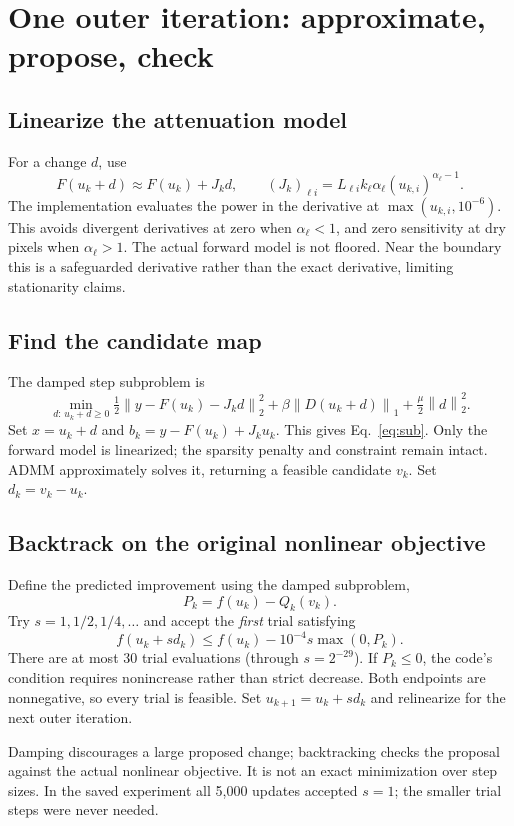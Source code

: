 \documentclass[11pt,a4paper]{article}
\newcommand{\norm}[1]{\left\lVert#1\right\rVert}
\begin{document}
\section{One outer iteration: approximate, propose, check}
\subsection{Linearize the attenuation model}
For a change $d$, use
\[
 F(u_k+d)\approx F(u_k)+J_kd,\qquad
 (J_k)_{\ell i}=L_{\ell i}k_\ell\alpha_\ell(u_{k,i})^{\alpha_\ell-1}.
\]
The implementation evaluates the power in the derivative at $\max(u_{k,i},10^{-6})$. This avoids divergent derivatives at zero when $\alpha_\ell<1$, and zero sensitivity at dry pixels when $\alpha_\ell>1$. The actual forward model is not floored. Near the boundary this is a safeguarded derivative rather than the exact derivative, limiting stationarity claims.
\subsection{Find the candidate map}
The damped step subproblem is
\[
 \min_{d:\,u_k+d\ge0}
 \tfrac12\norm{y-F(u_k)-J_kd}_2^2
 +\beta\norm{D(u_k+d)}_1+\tfrac\mu2\norm d_2^2.
\]
Set $x=u_k+d$ and $b_k=y-F(u_k)+J_ku_k$. This gives Eq.~\eqref{eq:sub}. Only the forward model is linearized; the sparsity penalty and constraint remain intact. ADMM approximately solves it, returning a feasible candidate $v_k$. Set $d_k=v_k-u_k$.
\subsection{Backtrack on the original nonlinear objective}
Define the predicted improvement using the damped subproblem,
\[
 P_k=f(u_k)-Q_k(v_k).
\]
Try $s=1,1/2,1/4,\ldots$ and accept the \emph{first} trial satisfying
\begin{equation}
 f(u_k+s d_k)\le f(u_k)-10^{-4}s\max(0,P_k).\label{eq:armijo}
\end{equation}
There are at most 30 trial evaluations (through $s=2^{-29}$). If $P_k\le0$, the code's condition requires nonincrease rather than strict decrease. Both endpoints are nonnegative, so every trial is feasible. Set $u_{k+1}=u_k+s d_k$ and relinearize for the next outer iteration.

Damping discourages a large proposed change; backtracking checks the proposal against the actual nonlinear objective. It is not an exact minimization over step sizes. In the saved experiment all 5,000 updates accepted $s=1$; the smaller trial steps were never needed.
\end{document}
